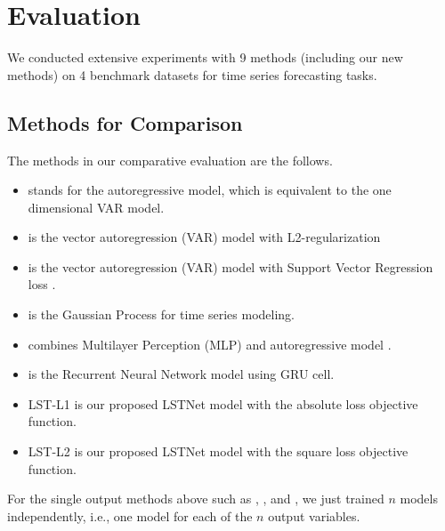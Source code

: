 \section{Evaluation}
\label{sec:experiment}


We conducted extensive experiments with 9 methods (including our new methods) on 4 benchmark datasets for time series forecasting tasks.

\subsection{Methods for Comparison}
\label{sec:baseline}
The methods in our comparative evaluation are the follows.
\begin{itemize}
    \item \AR stands for the autoregressive model, which is equivalent to the one dimensional VAR model. 
    \item \LRidge is the vector autoregression (VAR) model with L2-regularization
    \item \LSVR is the vector autoregression (VAR) model with Support Vector Regression loss \cite{vapnik1997support} . 
    \item \GP is the Gaussian Process for time series modeling. \cite{frigola2015bayesian,roberts2013gaussian}
    \item \VARMLP combines Multilayer Perception (MLP) and autoregressive model \cite{zhang2003time}. 
    \item \RNN is the Recurrent Neural Network model using GRU cell. %
    \item LST-L1 is our proposed LSTNet model with the absolute loss objective function.
    \item LST-L2 is our proposed LSTNet model with the square loss objective function.
\end{itemize}
For the single output methods above such as \AR, \LRidge, \LSVR and \GP, we just trained $n$ models independently, i.e., one model for each of the $n$ output variables.

